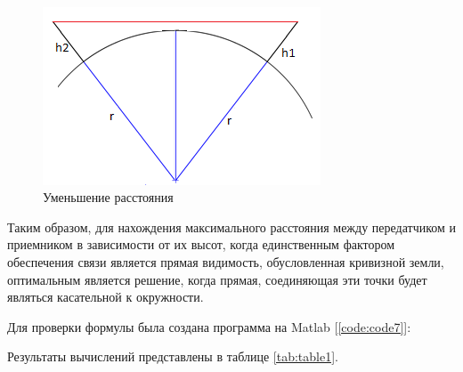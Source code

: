 \begin{figure}[H]
\centering{}\includegraphics[width=3.25in,height=2.08in]{img/kich_bur/image10.png}
\caption{Уменьшение расстояния}
\label{fig:img10}
\end{figure}

Таким образом, для нахождения максимального расстояния между передатчиком и приемником в зависимости от их высот, когда единственным фактором обеспечения связи является прямая видимость, обусловленная кривизной
земли, оптимальным является решение, когда прямая, соединяющая эти точки будет являться касательной к окружности.

Для проверки формулы была создана программа на Matlab [\ref{code:code7}]:


Результаты вычислений представлены в таблице \ref{tab:table1}. 
\begin{table}
	\centering
	\caption{Результаты вычислений}
	\label{tab:table1}
\end{table}
\newpage